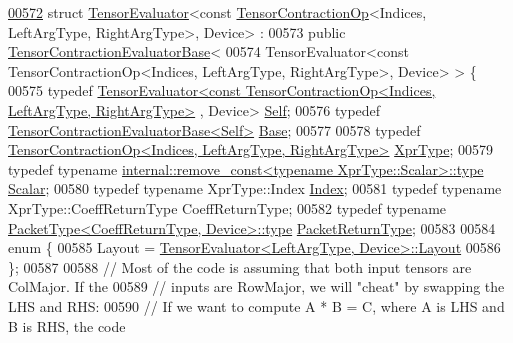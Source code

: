 \begin{DoxyCode}
\hyperlink{struct_eigen_1_1_tensor_evaluator_3_01const_01_tensor_contraction_op_3_01_indices_00_01_left_arg1f297d3eabde0efec8e4d9b1aa9abe5a}{00572} \textcolor{keyword}{struct }\hyperlink{struct_eigen_1_1_tensor_evaluator}{TensorEvaluator}<const \hyperlink{class_eigen_1_1_tensor_contraction_op}{TensorContractionOp}<Indices, LeftArgType, 
      RightArgType>, Device> :
00573     \textcolor{keyword}{public} \hyperlink{struct_eigen_1_1_tensor_contraction_evaluator_base}{TensorContractionEvaluatorBase}<
00574       TensorEvaluator<const TensorContractionOp<Indices, LeftArgType, RightArgType>, Device> > \{
00575   \textcolor{keyword}{typedef} 
      \hyperlink{struct_eigen_1_1_tensor_evaluator}{TensorEvaluator<const TensorContractionOp<Indices, LeftArgType, RightArgType>}
      , Device> \hyperlink{struct_eigen_1_1_tensor_evaluator_3_01const_01_tensor_contraction_op_3_01_indices_00_01_left_arg1f297d3eabde0efec8e4d9b1aa9abe5a}{Self};
00576   \textcolor{keyword}{typedef} \hyperlink{struct_eigen_1_1_tensor_contraction_evaluator_base}{TensorContractionEvaluatorBase<Self>} 
      \hyperlink{struct_eigen_1_1_tensor_contraction_evaluator_base}{Base};
00577 
00578   \textcolor{keyword}{typedef} \hyperlink{class_eigen_1_1_tensor_contraction_op}{TensorContractionOp<Indices, LeftArgType, RightArgType>}
       \hyperlink{class_eigen_1_1_tensor_contraction_op}{XprType};
00579   \textcolor{keyword}{typedef} \textcolor{keyword}{typename} \hyperlink{group___sparse_core___module}{internal::remove\_const<typename XprType::Scalar>::type}
       \hyperlink{group___sparse_core___module}{Scalar};
00580   \textcolor{keyword}{typedef} \textcolor{keyword}{typename} XprType::Index \hyperlink{namespace_eigen_a62e77e0933482dafde8fe197d9a2cfde}{Index};
00581   \textcolor{keyword}{typedef} \textcolor{keyword}{typename} XprType::CoeffReturnType CoeffReturnType;
00582   \textcolor{keyword}{typedef} \textcolor{keyword}{typename} \hyperlink{group___sparse_core___module}{PacketType<CoeffReturnType, Device>::type} 
      \hyperlink{group___sparse_core___module}{PacketReturnType};
00583 
00584   \textcolor{keyword}{enum} \{
00585     Layout = \hyperlink{struct_eigen_1_1_tensor_evaluator}{TensorEvaluator<LeftArgType, Device>::Layout}
00586   \};
00587 
00588   \textcolor{comment}{// Most of the code is assuming that both input tensors are ColMajor. If the}
00589   \textcolor{comment}{// inputs are RowMajor, we will "cheat" by swapping the LHS and RHS:}
00590   \textcolor{comment}{// If we want to compute A * B = C, where A is LHS and B is RHS, the code}

\end{DoxyCode}

